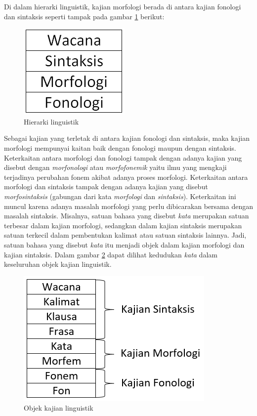 Di dalam hierarki linguistik, kajian morfologi berada di antara kajian fonologi dan sintaksis seperti tampak pada gambar \ref{gambar-hierarki-linguistik} berikut:

\begin{figure}[H]
\centering
\includegraphics[scale=0.75]{Gambar/gambar-hierarki-linguistik}
\caption[Hierarki linguistik]{Hierarki linguistik\cite{chaer:08:morfologi}} 
\label{gambar-hierarki-linguistik}
\end{figure}

Sebagai kajian yang terletak di antara kajian fonologi dan sintaksis, maka kajian morfologi mempunyai kaitan baik dengan fonologi maupun dengan sintaksis. Keterkaitan antara morfologi dan fonologi tampak dengan adanya kajian yang disebut dengan \textit{morfonologi} atau \textit{morfofonemik} yaitu ilmu yang mengkaji terjadinya perubahan fonem akibat adanya proses morfologi. Keterkaitan antara morfologi dan sintaksis tampak dengan adanya kajian yang disebut \textit{morfosintaksis} (gabungan dari kata \textit{morfologi} dan \textit{sintaksis}). Keterkaitan ini muncul karena adanya masalah morfologi yang perlu dibicarakan bersama dengan masalah sintaksis. Misalnya, satuan bahasa yang disebut \textit{kata} merupakan satuan terbesar dalam kajian morfologi, sedangkan dalam kajian sintaksis merupakan satuan terkecil dalam pembentukan kalimat atau satuan sintaksis lainnya. Jadi, satuan bahasa yang disebut \textit{kata} itu menjadi objek dalam kajian morfologi dan kajian sintaksis. Dalam gambar \ref{gambar-objek-kajian-linguistik} dapat dilihat kedudukan \textit{kata} dalam keseluruhan objek kajian linguistik.

\begin{figure}[H]
\centering
\includegraphics[scale=0.75]{Gambar/gambar-objek-kajian-linguistik}
\caption[Objek kajian linguistik]{Objek kajian linguistik\cite{chaer:08:morfologi}} 
\label{gambar-objek-kajian-linguistik}
\end{figure}

